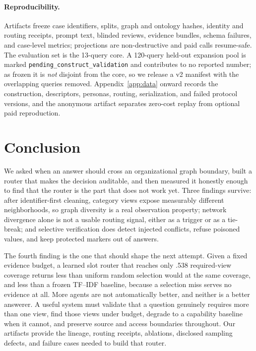 \documentclass{article}
\begin{document}
\paragraph{Reproducibility.} Artifacts freeze case identifiers, splits, graph and ontology hashes, identity and routing receipts, prompt text, blinded reviews, evidence bundles, schema failures, and case-level metrics; projections are non-destructive and paid calls resume-safe. The evaluation set is the 13-query core. A 120-query held-out expansion pool is marked \texttt{pending\_construct\_validation} and contributes to no reported number; as frozen it is \emph{not} disjoint from the core, so we release a v2 manifest with the overlapping queries removed. Appendix~\ref{app:data} onward records the construction, descriptors, personas, routing, serialization, and failed protocol versions, and the anonymous artifact separates zero-cost replay from optional paid reproduction.

\section{Conclusion}
We asked when an answer should cross an organizational graph boundary, built a router that makes the decision auditable, and then measured it honestly enough to find that the router is the part that does not work yet. Three findings survive: after identifier-first cleaning, category views expose measurably different neighborhoods, so graph diversity is a real observation property; network divergence alone is not a usable routing signal, either as a trigger or as a tie-break; and selective verification does detect injected conflicts, refuse poisoned values, and keep protected markers out of answers.

The fourth finding is the one that should shape the next attempt. Given a fixed evidence budget, a learned slot router that reaches only .538 required-view coverage returns less than uniform random selection would at the same coverage, and less than a frozen TF--IDF baseline, because a selection miss serves no evidence at all. More agents are not automatically better, and neither is a better answerer. A useful system must validate that a question genuinely requires more than one view, find those views under budget, degrade to a capability baseline when it cannot, and preserve source and access boundaries throughout. Our artifacts provide the lineage, routing receipts, ablations, disclosed sampling defects, and failure cases needed to build that router.




\appendix


\small
\end{document}

